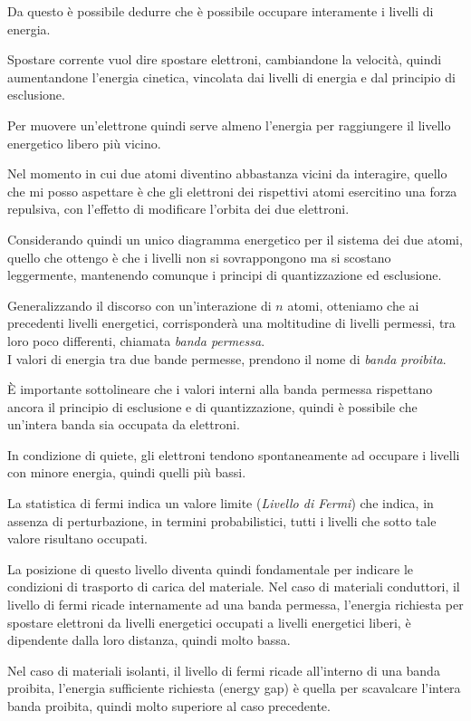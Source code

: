 \documentclass[../template]{subfiles}
\begin{document}
Da questo è possibile dedurre che è possibile occupare interamente i livelli di energia.

Spostare corrente vuol dire spostare elettroni, cambiandone la velocità, quindi aumentandone l'energia cinetica, vincolata dai livelli di energia e dal principio di esclusione.

Per muovere un'elettrone quindi serve almeno l'energia per raggiungere il livello energetico libero più vicino.

Nel momento in cui due atomi diventino abbastanza vicini da interagire, quello che mi posso aspettare è che gli elettroni dei rispettivi atomi esercitino una forza repulsiva, con l'effetto di modificare l'orbita dei due elettroni.

Considerando quindi un unico diagramma energetico per il sistema dei due atomi, quello che ottengo è che i livelli non si sovrappongono ma si scostano leggermente, mantenendo comunque i principi di quantizzazione ed esclusione.

Generalizzando il discorso con un'interazione di $n$ atomi, otteniamo che ai precedenti livelli energetici, corrisponderà una moltitudine di livelli permessi, tra loro poco differenti, chiamata \textit{banda permessa}.
\\
I valori di energia tra due bande permesse, prendono il nome di \textit{banda proibita}.

È importante sottolineare che i valori interni alla banda permessa rispettano ancora il principio di esclusione e di quantizzazione, quindi è possibile che un'intera banda sia occupata da elettroni.

In condizione di quiete, gli elettroni tendono spontaneamente ad occupare i livelli con minore energia, quindi quelli più bassi.

La statistica di fermi indica un valore limite (\textit{Livello di Fermi}) che indica, in assenza di perturbazione, in termini probabilistici, tutti i livelli che sotto tale valore risultano occupati.

La posizione di questo livello diventa quindi fondamentale per indicare le condizioni di trasporto di carica del materiale.
Nel caso di materiali conduttori, il livello di fermi ricade internamente ad una banda permessa,
l'energia richiesta per spostare elettroni da livelli energetici occupati a livelli energetici liberi, è dipendente dalla loro distanza, quindi molto bassa.

Nel caso di materiali isolanti, il livello di fermi ricade all'interno di una banda proibita, l'energia sufficiente richiesta (energy gap) è quella per scavalcare l'intera banda proibita, quindi molto superiore al caso precedente.
\end{document}

